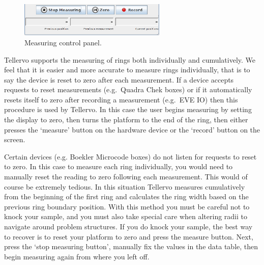 \begin{figure}
  \begin{center}
    \includegraphics[width=70mm]{Images/measurepanel.png}
  \end{center}
  \caption{Measuring control panel.}
  \label{fig:measurepanel}
\end{figure}


Tellervo supports the measuring of rings both individually and cumulatively.  We feel that it is easier and more accurate to measure rings individually, that is to say the device is reset to zero after each measurement.  If a device accepts requests to reset measurements (e.g.\ Quadra Chek boxes) or if it automatically resets itself to zero after recording a measurement (e.g.\ EVE IO) then this procedure is used by Tellervo.  In this case the user begins measuring by setting the display to zero, then turns the platform to the end of the ring, then either presses the `measure' button on the hardware device or the `record' button on the screen.


Certain devices (e.g. Boekler Microcode boxes) do not listen for requests to reset to zero.  In this case to measure each ring individually, you would need to manually reset the reading to zero following each measurement.  This would of course be extremely tedious.  In this situation Tellervo measures cumulatively from the beginning of the first ring and calculates the ring width based on the previous ring boundary position.  With this method you must be careful not to knock your sample, and you must also take special care when altering radii to navigate around problem structures.  If you do knock your sample, the best way to recover is to reset your platform to zero and press the measure button.  Next, press the `stop measuring button', manually fix the values in the data table, then begin measuring again from where you left off.

